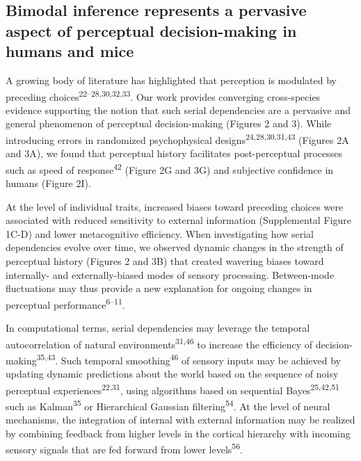 \documentclass[
]{article}
\begin{document}
\hypertarget{bimodal-inference-represents-a-pervasive-aspect-of-perceptual-decision-making-in-humans-and-mice}{%
\subsection{Bimodal inference represents a pervasive aspect of
perceptual decision-making in humans and
mice}\label{bimodal-inference-represents-a-pervasive-aspect-of-perceptual-decision-making-in-humans-and-mice}}

A growing body of literature has highlighted that perception is
modulated by preceding choices\textsuperscript{22--28,30,32,33}. Our
work provides converging cross-species evidence supporting the notion
that such serial dependencies are a pervasive and general phenomenon of
perceptual decision-making (Figures 2 and 3). While introducing errors
in randomized psychophysical designs\textsuperscript{24,28,30,31,43}
(Figures 2A and 3A), we found that perceptual history facilitates
post-perceptual processes such as speed of response\textsuperscript{42}
(Figure 2G and 3G) and subjective confidence in humans (Figure 2I).

At the level of individual traits, increased biases toward preceding
choices were associated with reduced sensitivity to external information
(Supplemental Figure 1C-D) and lower metacognitive efficiency. When
investigating how serial dependencies evolve over time, we observed
dynamic changes in the strength of perceptual history (Figures 2 and 3B)
that created wavering biases toward internally- and externally-biased
modes of sensory processing. Between-mode fluctuations may thus provide
a new explanation for ongoing changes in perceptual
performance\textsuperscript{6--11}.

In computational terms, serial dependencies may leverage the temporal
autocorrelation of natural environments\textsuperscript{31,46} to
increase the efficiency of decision-making\textsuperscript{35,43}. Such
temporal smoothing\textsuperscript{46} of sensory inputs may be achieved
by updating dynamic predictions about the world based on the sequence of
noisy perceptual experiences\textsuperscript{22,31}, using algorithms
based on sequential Bayes\textsuperscript{25,42,51} such as
Kalman\textsuperscript{35} or Hierarchical Gaussian
filtering\textsuperscript{54}. At the level of neural mechanisms, the
integration of internal with external information may be realized by
combining feedback from higher levels in the cortical hierarchy with
incoming sensory signals that are fed forward from lower
levels\textsuperscript{56}.
\end{document}
